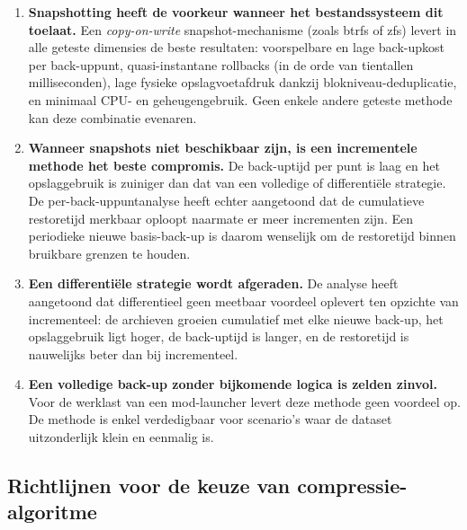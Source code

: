 \begin{enumerate}
    \item \textbf{Snapshotting heeft de voorkeur wanneer het bestandssysteem dit toelaat.} Een \textit{copy-on-write} snapshot-mechanisme (zoals btrfs of zfs) levert in alle geteste dimensies de beste resultaten: voorspelbare en lage back-up\-kost per back-uppunt, quasi-instantane rollbacks (in de orde van tientallen milliseconden), lage fysieke opslagvoetafdruk dankzij blok\-niveau-deduplicatie, en minimaal CPU- en geheugengebruik. Geen enkele andere geteste methode kan deze combinatie evenaren.
    \item \textbf{Wanneer snapshots niet beschikbaar zijn, is een incrementele methode het beste compromis.} De back-uptijd per punt is laag en het opslaggebruik is zuiniger dan dat van een volledige of differentiële strategie. De per-back-uppuntanalyse heeft echter aangetoond dat de cumulatieve restoretijd merkbaar oploopt naarmate er meer incrementen zijn. Een periodieke nieuwe basis-back-up is daarom wenselijk om de restoretijd binnen bruikbare grenzen te houden.
    \item \textbf{Een differentiële strategie wordt afgeraden.} De analyse heeft aangetoond dat differentieel geen meetbaar voordeel oplevert ten opzichte van incrementeel: de archieven groeien cumulatief met elke nieuwe back-up, het opslaggebruik ligt hoger, de back-uptijd is langer, en de restoretijd is nauwelijks beter dan bij incrementeel.
    \item \textbf{Een volledige back-up zonder bijkomende logica is zelden zinvol.} Voor de werklast van een mod-launcher levert deze methode geen voordeel op. De methode is enkel verdedigbaar voor scenario's waar de dataset uitzonderlijk klein en eenmalig is.
\end{enumerate}

\subsection{Richtlijnen voor de keuze van compressie-algoritme}

